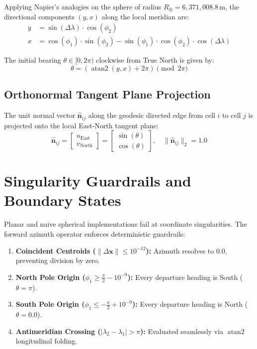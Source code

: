 \documentclass[11pt,a4paper]{article}
\begin{document}
Applying Napier's analogies on the sphere of radius $R_\oplus = 6,371,008.8\,\text{m}$, the directional components $(y, x)$ along the local meridian are:
\begin{align}
y &= \sin(\Delta\lambda) \cdot \cos(\phi_2) \\
x &= \cos(\phi_1) \cdot \sin(\phi_2) - \sin(\phi_1) \cdot \cos(\phi_2) \cdot \cos(\Delta\lambda)
\end{align}

The initial bearing $\theta \in [0, 2\pi)$ clockwise from True North is given by:
\begin{equation}
\theta = \left(\operatorname{atan2}(y, x) + 2\pi\right) \pmod{2\pi}
\end{equation}

\subsection{Orthonormal Tangent Plane Projection}
The unit normal vector $\hat{\mathbf{n}}_{ij}$ along the geodesic directed edge from cell $i$ to cell $j$ is projected onto the local East-North tangent plane:
\begin{equation}
\hat{\mathbf{n}}_{ij} = \begin{bmatrix} u_{\text{East}} \\ v_{\text{North}} \end{bmatrix} = \begin{bmatrix} \sin(\theta) \\ \cos(\theta) \end{bmatrix}, \quad \|\hat{\mathbf{n}}_{ij}\|_2 = 1.0
\end{equation}

\section{Singularity Guardrails and Boundary States}
Planar and naive spherical implementations fail at coordinate singularities. The forward azimuth operator enforces deterministic guardrails:
\begin{enumerate}
    \item \textbf{Coincident Centroids ($\|\Delta\mathbf{x}\| \le 10^{-12}$):} Azimuth resolves to $0.0$, preventing division by zero.
    \item \textbf{North Pole Origin ($\phi_1 \ge \frac{\pi}{2} - 10^{-9}$):} Every departure heading is South ($\theta = \pi$).
    \item \textbf{South Pole Origin ($\phi_1 \le -\frac{\pi}{2} + 10^{-9}$):} Every departure heading is North ($\theta = 0.0$).
    \item \textbf{Antimeridian Crossing ($|\lambda_2 - \lambda_1| > \pi$):} Evaluated seamlessly via $\operatorname{atan2}$ longitudinal folding.
\end{enumerate}
\end{document}

